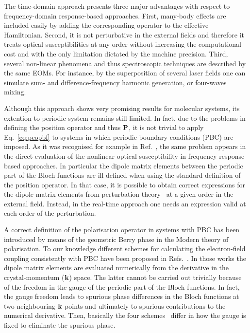  
The time-domain approach presents three major advantages with respect to frequency-domain response-based approaches. First, many-body effects are included easily by adding the corresponding operator to the effective Hamiltonian. Second, it is not perturbative in the external fields and therefore it treats optical susceptibilities at any order without increasing the computational cost and with the only limitation dictated by the machine precision. Third, several non-linear phenomena and thus spectroscopic techniques are described by the same EOMs. For instance, by the superposition of several laser fields one can simulate sum- and difference-frequency harmonic generation, or four-waves mixing.\cite{boyd}

Although this approach shows very promising results for molecular systems, its extention to periodic system remains still limited.
In fact, due to the problems in defining the position operator and thus ${\bf P}$, it is not trivial to apply Eq.~\eqref{eq:peopbf} to systems in which periodic boundary conditions (PBC) are imposed. As it was recognised for example in Ref.~\cite{PhysRevB.52.14636}, the same problem appears in the direct evaluation of the nonlinear optical susceptibility in frequency-response based approaches. In particular the dipole matrix elements between the periodic part of the Bloch functions are ill-defined when using the standard definition of the  position operator. In that case, it is possible to obtain correct expressions for the dipole matrix elements from perturbation theory~\cite{PhysRevB.52.14636,PhysRevB.48.11705,PhysRevB.82.235201,korbel2015optical} at a given order in the external field. Instead, in the real-time approach one needs an expression valid at each order of the perturbation.

A correct definition of the polarisation operator in systems with PBC has been introduced by means of the geometric Berry phase in the Modern theory of polarisation.\cite{RevModPhys.66.899} 
To our knowledge different schemes for calculating the electron-field coupling consistently with PBC have been proposed in Refs.~\cite{springborg, PhysRevB.76.035213, souza_prb, korbel2015optical}. In those works the dipole matrix elements are evaluated numerically from the derivative in the crystal-momentum (${\bf k}$) space. The latter cannot be carried out trivially because of the freedom in the gauge of the periodic part of the Bloch functions. In fact, the gauge freedom leads to spurious phase differences in the Bloch functions at two neighbouring ${\bf k}$ points and ultimately to spurious contributions to the numerical derivative.
Then, basically the four schemes~\cite{springborg, PhysRevB.76.035213, souza_prb, korbel2015optical} differ in how the gauge is fixed to eliminate the spurious phase.

